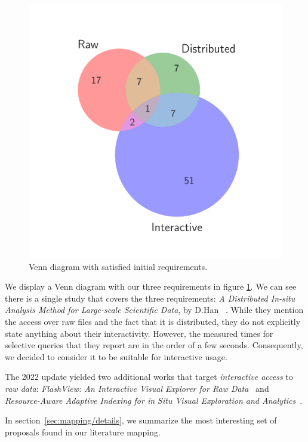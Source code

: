 \begin{figure}[htbp]
    \centering
    \includegraphics{images/3_mapping/venn}
    \caption{Venn diagram with satisfied initial requirements.}
    \label{fig:mapping/venn_requirements}
\end{figure}

We display a Venn diagram with our three requirements in figure \ref{fig:mapping/venn_requirements}. We can see there is a single study that covers the three requirements:
\textit{{A} {D}istributed {I}n-situ {A}nalysis {M}ethod for {L}arge-scale
{S}cientific {D}ata}, by D.Han \etal~\cite{Han2017}. While they mention the
access over raw files and the fact that it is distributed, they do not
explicitly state anything about their interactivity. However, the measured times
for selective queries that they report are in the order of a few seconds. Consequently, we
decided to consider it to be suitable for interactive usage.

The 2022 update yielded two additional works that target \emph{interactive access}
to \emph{raw data}: \textit{{FlashView}: {A}n {I}nteractive {V}isual {E}xplorer
for {R}aw {D}ata}~\cite{pang_flashview_2017} and
\textit{{R}esource-{A}ware {A}daptive {I}ndexing for in {S}itu {V}isual {E}xploration
and {A}nalytics}~\cite{maroulis_resourceaware_2023}.


In section~\ref{sec:mapping/details}, we summarize the most interesting set of
proposals found in our literature mapping.

